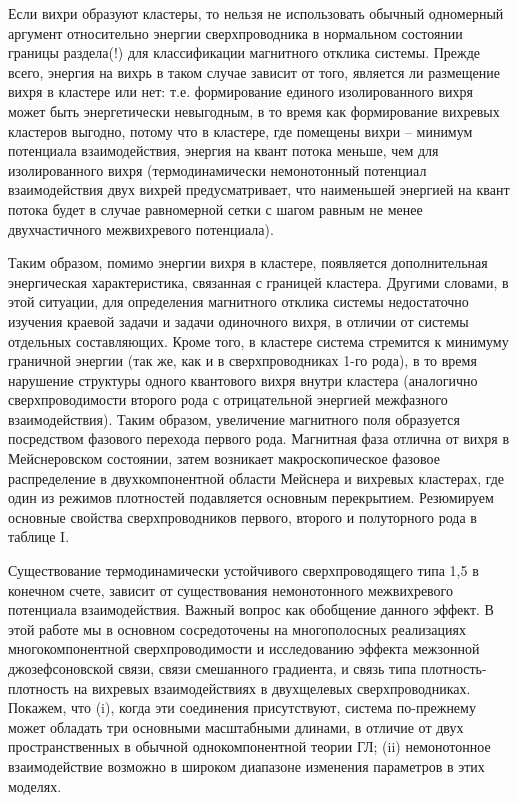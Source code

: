 Если вихри образуют кластеры, то нельзя не использовать обычный одномерный 
аргумент относительно энергии сверхпроводника в нормальном состоянии границы 
раздела(!) для классификации магнитного отклика системы. Прежде всего, энергия 
на вихрь в таком случае зависит от того, является ли размещение вихря в 
кластере или нет: т.е. формирование единого изолированного вихря может быть 
энергетически невыгодным, в то время как формирование вихревых кластеров 
выгодно, потому что в кластере, где помещены вихри -- минимум потенциала 
взаимодействия, энергия на квант потока меньше, чем для изолированного вихря
(термодинамически немонотонный потенциал взаимодействия двух вихрей 
предусматривает, что наименьшей энергией на квант потока будет в случае
равномерной сетки с шагом равным не менее двухчастичного межвихревого 
потенциала).

Таким образом, помимо энергии вихря в кластере, появляется дополнительная 
энергическая характеристика, связанная с границей кластера. Другими словами, в 
этой ситуации, для определения магнитного отклика системы недостаточно 
изучения краевой задачи и задачи одиночного вихря, в отличии от системы 
отдельных составляющих. Кроме того, в кластере система стремится к минимуму 
граничной энергии (так же, как и в сверхпроводниках 1-го рода), в то время 
нарушение структуры одного квантового вихря внутри кластера (аналогично 
сверхпроводимости второго рода с отрицательной энергией межфазного 
взаимодействия). Таким образом, увеличение магнитного поля образуется 
посредством фазового перехода первого рода. Магнитная фаза отлична от вихря в 
Мейснеровском состоянии, затем возникает макроскопическое фазовое 
распределение в двухкомпонентной области Мейснера и вихревых кластерах, где 
один из режимов плотностей подавляется основным перекрытием. Резюмируем 
основные свойства сверхпроводников первого, второго и полуторного рода в 
таблице I.

Существование термодинамически устойчивого сверхпроводящего типа 1,5 в конечном 
счете, зависит от существования немонотонного межвихревого потенциала 
взаимодействия. Важный вопрос как обобщение данного эффект. В этой работе 
мы в основном сосредоточены на многополосных реализациях многокомпонентной 
сверхпроводимости и исследованию эффекта межзонной джозефсоновской связи, 
связи смешанного градиента, и связь типа плотность-плотность на вихревых 
взаимодействиях в двухщелевых сверхпроводниках. Покажем, что (i), когда эти 
соединения присутствуют, система по-прежнему может обладать три основными 
масштабными длинами, в отличие от двух пространственных в обычной 
однокомпонентной теории ГЛ; (ii) немонотонное взаимодействие возможно в 
широком диапазоне изменения параметров в этих моделях.

